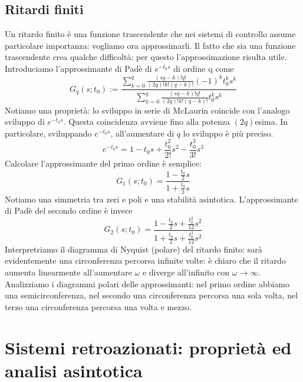 \documentclass[11pt]{article}
\begin{document}
\subsection{Ritardi finiti}
Un ritardo finito è una funzione trascendente che nei sistemi di controllo assume particolare importanza: vogliamo ora approssimarli. Il fatto che sia una funzione trascendente crea qualche difficoltà: per questo l'approssimazione risulta utile. Introduciamo l'approssimante di Padè di $e^{-t_0s}$ di ordine q come
\begin{displaymath}
    G_q(s;t_0) := \frac{\sum_{k=0}^q \frac{(sq-k)!q!}{(2q)!k!(q-k)!}(-1)^k t^k_0 s^k}{\sum_{k=0}^q \frac{(sq-k)!q!}{(2q)!k!(q-k)!} t^k_0 s^k}
\end{displaymath}
Notiamo una proprietà: lo sviluppo in serie di McLaurin coincide con l'analogo sviluppo di $e^{-t_0s}$. Questa coincidenza avviene fino alla potenza $(2q)$esima. In particolare, sviluppando $e^{-t_0s}$, all'aumentare di $q$ lo sviluppo è più preciso.
\begin{displaymath}
    e^{-t_0s} = 1- t_0s + \frac{t_0^2}{2!}s^2-\frac{t_0^3}{3!}s^3
\end{displaymath}
Calcolare l'approssimante del primo ordine è semplice:
\begin{displaymath}
    G_1(s;t_0) = \frac{1-\frac{t_0}{2}s}{1+\frac{t_0}{2}s}
\end{displaymath}
Notiamo una simmetria tra zeri e poli e una stabilità asintotica.
L'approssimante di Padè del secondo ordine è invece
\begin{displaymath}
    G_2(s;t_0) = \frac{1-\frac{t_0}{2}s + \frac{t_0^2}{12}s^2}{1+\frac{t_0}{2}s + \frac{t_0^2}{12}s^2}
\end{displaymath}
Interpretriamo il diagramma di Nyquist (polare) del ritardo finito: sarà evidentemente una circonferenza percorsa infinite volte: è chiaro che il ritardo aumenta linearmente all'aumentare $\omega$ e diverge all'infinito con $\omega\rightarrow\infty$. Analizziamo i diagrammi polari delle approssimanti: nel primo ordine abbiamo una semicirconferenza, nel secondo una circonferenza percorsa una sola volta, nel terzo una circonferenza percorsa una volta e mezzo.
\section{Sistemi retroazionati: proprietà ed analisi asintotica}
\end{document}
